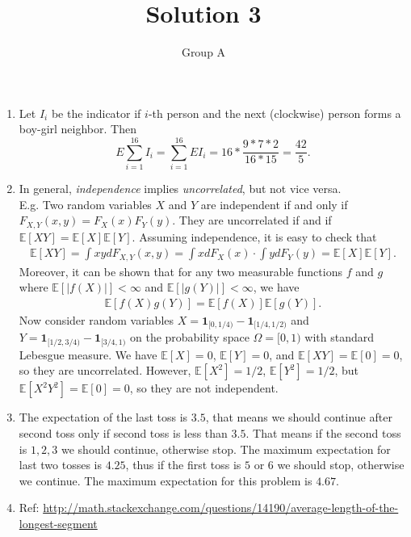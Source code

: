 \documentclass[10pt, onecolumn, draftcls]{IEEEtran}
\begin{document}
\title{Solution 3}
\author{Group A}
\maketitle


\begin{enumerate}
\item
Let $I_i$ be the indicator if $i$-th person and the next (clockwise) person forms a boy-girl neighbor. Then
$$E\sum_{i=1}^{16}I_i=\sum_{i=1}^{16} EI_i=16*\frac{9*7*2}{16*15}=\frac{42}{5}.$$

\item In general, \emph{independence} implies \emph{uncorrelated}, but not vice versa.\\
E.g. Two random variables $X$ and $Y$ are independent if and only if $F_{X, Y}(x, y) = F_X(x)F_Y(y)$. They are uncorrelated if and if $\mathbb{E}[XY] = \mathbb{E}[X]\mathbb{E}[Y]$. Assuming independence, it is easy to check that
\begin{align*}
\mathbb{E}[XY] = \int xy dF_{X, Y}(x, y) = \int xdF_X(x)\cdot\int ydF_Y(y) = \mathbb{E}[X]\mathbb{E}[Y].
\end{align*}
Moreover, it can be shown that for any two measurable functions $f$ and $g$ where $\mathbb{E}[|f(X)|] < \infty$ and $\mathbb{E}[|g(Y)|] < \infty$, we have
\begin{align*}
\mathbb{E}[f(X)g(Y)] = \mathbb{E}[f(X)]\mathbb{E}[g(Y)].
\end{align*}
Now consider random variables $X = \textbf{1}_{[0, 1/4)} - \textbf{1}_{[1/4, 1/2)}$ and $Y = \textbf{1}_{[1/2, 3/4)} - \textbf{1}_{[3/4, 1)}$ on the probability space $\Omega = [0, 1)$ with standard Lebesgue measure. We have $\mathbb{E}[X] = 0$, $\mathbb{E}[Y] = 0$, and $\mathbb{E}[XY] = \mathbb{E}[0] = 0$, so they are uncorrelated. However, $\mathbb{E}[X^2] = 1/2$, $\mathbb{E}[Y^2] = 1/2$, but $\mathbb{E}[X^2Y^2] = \mathbb{E}[0] = 0$, so they are not independent.

\item
The expectation of the last toss is $3.5$, that means we should continue after second toss only if second toss is less than $3.5$. That means if the second toss is $1,2,3$ we should continue, otherwise stop. The maximum expectation for last two tosses is $4.25$, thus if the first toss is $5$ or $6$ we should stop, otherwise we continue. The maximum expectation for this problem is $4.67$.

\item
Ref: \url{http://math.stackexchange.com/questions/14190/average-length-of-the-longest-segment}


\end{enumerate}
\end{document}
